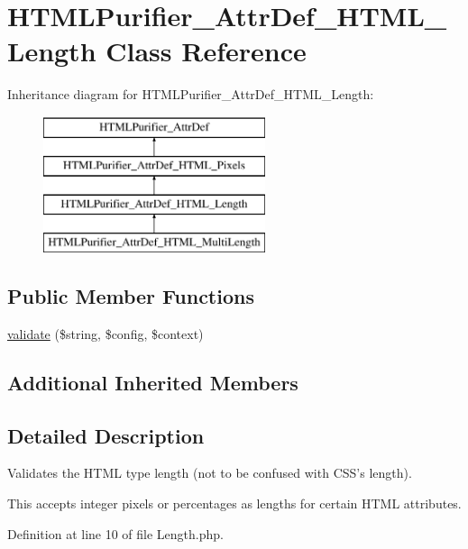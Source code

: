 \hypertarget{classHTMLPurifier__AttrDef__HTML__Length}{\section{H\+T\+M\+L\+Purifier\+\_\+\+Attr\+Def\+\_\+\+H\+T\+M\+L\+\_\+\+Length Class Reference}
\label{classHTMLPurifier__AttrDef__HTML__Length}
}
Inheritance diagram for H\+T\+M\+L\+Purifier\+\_\+\+Attr\+Def\+\_\+\+H\+T\+M\+L\+\_\+\+Length\+:\begin{figure}[H]
\begin{center}
\leavevmode
\includegraphics[height=4.000000cm]{classHTMLPurifier__AttrDef__HTML__Length}
\end{center}
\end{figure}
\subsection*{Public Member Functions}
\begin{DoxyCompactItemize}
\item 
\hyperlink{classHTMLPurifier__AttrDef__HTML__Length_a4899718554d545c292792d7f7eb15c8b}{validate} (\$string, \$config, \$context)
\end{DoxyCompactItemize}
\subsection*{Additional Inherited Members}


\subsection{Detailed Description}
Validates the H\+T\+M\+L type length (not to be confused with C\+S\+S's length).

This accepts integer pixels or percentages as lengths for certain H\+T\+M\+L attributes. 

Definition at line 10 of file Length.\+php.



